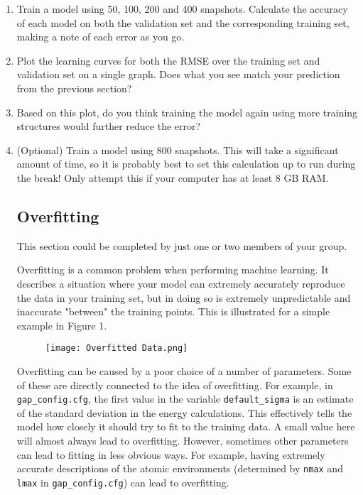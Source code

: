 \documentclass{article}
\begin{document}
\begin{enumerate}

\item Train a model using 50, 100, 200 and 400 snapshots. Calculate the accuracy of each model on both the validation set and the corresponding training set, making a note of each error as you go.
\item Plot the learning curves for both the RMSE over the training set and validation set on a single graph. Does what you see match your prediction from the previous section?
\item Based on this plot, do you think training the model again using more training structures would further reduce the error?
\item (Optional) Train a model using 800 snapshots. This will take a significant amount of time, so it is probably best to set this calculation up to run during the break! Only attempt this if your computer has at least 8 GB RAM.

\subsection{Overfitting}

This section could be completed by just one or two members of your group.

Overfitting is a common problem when performing machine learning. It describes a situation where your model can extremely accurately reproduce the data in your training set, but in doing so is extremely unpredictable and inaccurate "between" the training points. This is illustrated for a simple example in Figure 1.

\begin{figure}

\texttt{[image: Overfitted Data.png]}

\end{figure}

Overfitting can be caused by a poor choice of a number of parameters. Some of these are directly connected to the idea of overfitting. For example, in \verb|gap_config.cfg|, the first value in the variable \verb|default_sigma| is an estimate of the standard deviation in the energy calculations. This effectively tells the model how closely it should try to fit to the training data. A small value here will almost always lead to overfitting. However, sometimes other parameters can lead to fitting in less obvious ways. For example, having extremely accurate descriptions of the atomic environments (determined by \verb|nmax| and \verb|lmax| in \verb|gap_config.cfg|) can lead to overfitting.


\end{enumerate}
\end{document}
